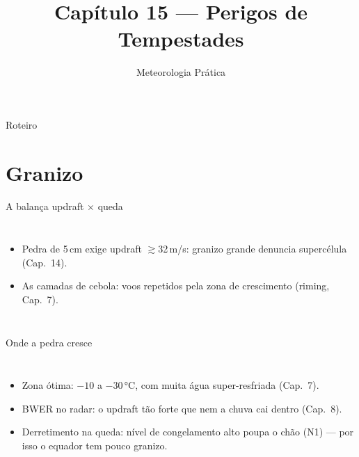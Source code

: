 \documentclass[aspectratio=169,11pt]{beamer}
\title[Cap. 15 --- Perigos]{Capítulo 15 --- Perigos de Tempestades}
\subtitle{Meteorologia Prática}
\author{}
\date{}
\begin{document}
\begin{frame}
  \titlepage
  \vfill
  \atribuicao
\end{frame}

\begin{frame}{Roteiro}
  \tableofcontents
\end{frame}

\section{Granizo}

\begin{frame}{A balança updraft × queda}
  \begin{columns}
    \vspace{0.4em}
    \begin{itemize}
      \item Pedra de 5\,cm exige updraft $\gtrsim$32\,m/s: granizo
            grande \alert{denuncia} supercélula (Cap.~14).
      \item As camadas de cebola: voos repetidos pela zona de
            crescimento (riming, Cap.~7).
    \end{itemize}
  \end{columns}
\end{frame}

\begin{frame}{Onde a pedra cresce}
  \begin{columns}
    \begin{itemize}
      \item Zona ótima: $-10$ a $-30\,°$C, com muita água
            super-resfriada (Cap.~7).
      \item BWER no radar: o updraft tão forte que nem a chuva cai
            dentro (Cap.~8).
      \item Derretimento na queda: nível de congelamento alto poupa o
            chão (N1) — por isso o equador tem pouco granizo.
    \end{itemize}
  \end{columns}
\end{frame}
\end{document}
